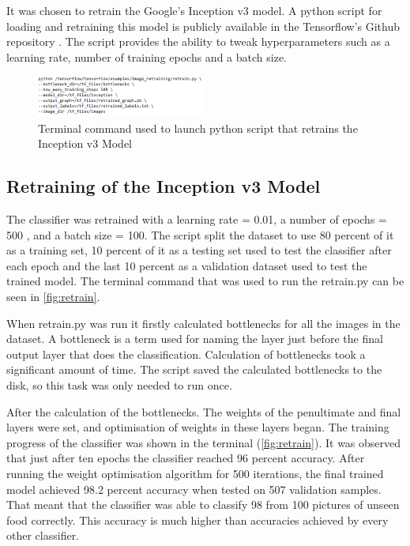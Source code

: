 It was chosen to retrain the Google's Inception v3 model. A python script for loading and retraining this model is publicly available in the Tensorflow's Github repository \cite{gitretrain}. The script provides the ability to tweak hyperparameters such as a learning rate, number of training epochs and a batch size. 


\begin{figure}[h]
\centering
\includegraphics[width=0.5\textwidth]{Figures/4/term.PNG}
\caption{Terminal command used to launch python script that retrains the Inception v3 Model}
\label{fig:retrain}
\end{figure}

\subsection{ Retraining of the Inception v3 Model}

The classifier was retrained with a learning rate = 0.01, a number of epochs = 500 , and a batch size = 100. The script split the dataset to use 80 percent of it as a training set, 10 percent of it as a testing set used to test the classifier after each epoch and the last 10 percent as a validation dataset used to test the trained model. The terminal command that was used to run the retrain.py can be seen in \autoref{fig:retrain}.

When retrain.py was run it firstly calculated bottlenecks for all the images in the dataset. A bottleneck is a term used for naming the layer just before the final output layer that does the classification. Calculation of bottlenecks took a significant amount of time. The script saved the calculated bottlenecks to the disk, so this task was only needed to run once.

After the calculation of the bottlenecks. The weights of the penultimate and final layers were set, and optimisation of weights in these layers began. The training progress of the classifier was shown in the terminal (\autoref{fig:retrain}). It was observed that just after ten epochs the classifier reached 96 percent accuracy.  After running the weight optimisation algorithm for 500 iterations, the final trained model achieved 98.2 percent accuracy when tested on 507 validation samples. That meant that the classifier was able to classify 98 from 100 pictures of unseen food correctly.  This accuracy is much higher than accuracies achieved by every other classifier.

